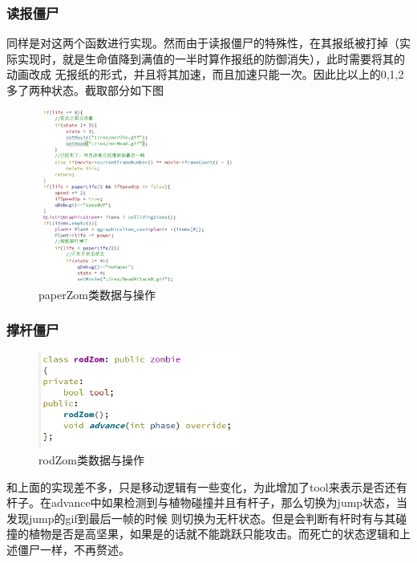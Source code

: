 \documentclass[12pt,a4paper,UTF8]{article}
\begin{document}
      \subsubsection{读报僵尸}
        同样是对这两个函数进行实现。然而由于读报僵尸的特殊性，在其报纸被打掉（实际实现时，就是生命值降到满值的一半时算作报纸的防御消失），此时需要将其的动画改成
        无报纸的形式，并且将其加速，而且加速只能一次。因此比以上的0,1,2多了两种状态。截取部分如下图
        \begin{figure}[H]
          \centering
        \includegraphics[width=0.6\textwidth]{figure/paperZom1.png}
        \caption{paperZom类数据与操作}
        \end{figure}

    \subsubsection{撑杆僵尸}
        \begin{figure}[H]
          \centering
        \includegraphics[width=0.6\textwidth]{figure/rodZom.png}
        \caption{rodZom类数据与操作}
        \end{figure}
        和上面的实现差不多，只是移动逻辑有一些变化，为此增加了tool来表示是否还有杆子。在advance中如果检测到与植物碰撞并且有杆子，那么切换为jump状态，当发现jump的gif到最后一帧的时候
        则切换为无杆状态。但是会判断有杆时有与其碰撞的植物是否是高坚果，如果是的话就不能跳跃只能攻击。而死亡的状态逻辑和上述僵尸一样，不再赘述。
\end{document}

